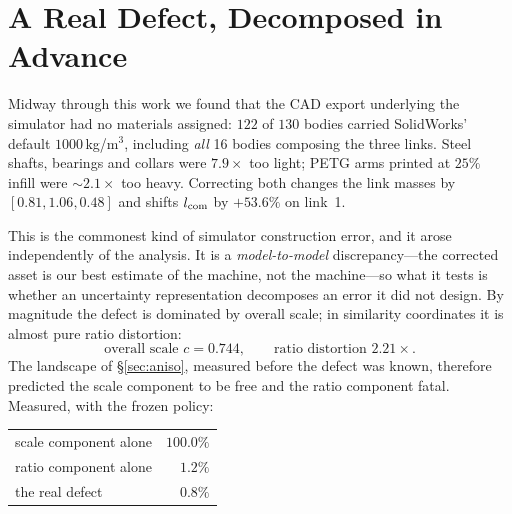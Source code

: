 \documentclass[conference]{IEEEtran}
\begin{document}

\section{A Real Defect, Decomposed in Advance}\label{sec:cad}

Midway through this work we found that the CAD export underlying the simulator
had no materials assigned: $122$ of $130$ bodies carried SolidWorks' default
$1000\,$kg/m$^3$, including \emph{all} 16 bodies composing the three links.
Steel shafts, bearings and collars were $7.9\times$ too light; PETG arms printed
at $25\%$ infill were $\sim\!2.1\times$ too heavy. Correcting both changes the
link masses by $[0.81, 1.06, 0.48]$ and shifts $l_{\rm com}$ by $+53.6\%$ on
link~1.

This is the commonest kind of simulator construction error, and it arose
independently of the analysis. It is a \emph{model-to-model} discrepancy---the
corrected asset is our best estimate of the machine, not the machine---so what
it tests is whether an uncertainty representation decomposes an error it did
not design. By magnitude the defect is dominated by overall scale; in similarity
coordinates it is almost pure ratio distortion:
\[
\text{overall scale } c = 0.744,\qquad
\text{ratio distortion } 2.21\times .
\]
The landscape of \S\ref{sec:aniso}, measured before the defect was known,
therefore predicted the scale component to be free and the ratio component
fatal. Measured, with the frozen policy:

\begin{center}
\begin{tabular}{lr}
\toprule
scale component alone & $100.0\%$\\
ratio component alone & $1.2\%$\\
the real defect & $0.8\%$\\
\bottomrule
\end{tabular}
\end{center}
\end{document}
